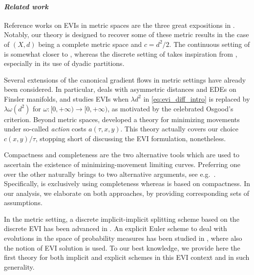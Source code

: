 \documentclass[reqno]{amsart}
\newcounter{results}[section]
\theoremstyle{plain}
\theoremstyle{remark}
\theoremstyle{plain}
\numberwithin{equation}{section}
\theoremstyle{remark}
\begin{document}
\medskip

\paragraph{\em\bfseries Related work}  Reference works on EVIs in metric spaces are the  three great expositions  in   \cite{ags08,Ambrosio2012userguide,MuratoriSavare}.  Notably, our theory is designed to recover some of these metric results in the case of $(X,d)$ being  a complete metric space and $c={d^2}/{2}$.  The  continuous setting of   is somewhat   closer to \cite[Section 3]{MuratoriSavare},  whereas the  discrete setting of   takes  inspiration from \cite[Section 3.2.4]{Ambrosio2012userguide},  especially in its use of dyadic partitions.  

Several extensions of the canonical gradient flows in metric settings have  already   been considered.  In particular, \cite{Ohta2023}  deals with  asymmetric distances and EDEs on Finsler manifolds,  and  \cite{Craig2017}  studies  EVIs when $\lambda d^2$ in \eqref{eq:evi_diff_intro} is  replaced by $\lambda \omega(d^2)$  for  $\omega:[0,+\infty)\to [0,+\infty)$,  as  motivated by  the celebrated  Osgood's criterion. Beyond  metric spaces,  \cite{Rossi2024} developed a theory for minimizing movements  under so-called  {\it action} costs $a(\tau,x,y)$.  This theory actually covers our choice ${c(x,y)}/{\tau}$, stopping short of discussing the EVI formulation, nonetheless.  

Compactness and completeness are  the two alternative tools which are used to ascertain the existence of minimizing-movement limiting curves. Preferring one over the other naturally brings to two alternative arguments, see e.g.~\cite{rankin2024jkoschemesgeneraltransport}.  Specifically, \cite{MuratoriSavare}  is exclusively using  completeness  whereas \cite{Ohta2023} is based  on compactness.  In our analysis, we elaborate on both approaches, by  providing corresponding sets  
of assumptions.   

In  the metric setting, a  discrete implicit-implicit splitting scheme based on the discrete EVI  has been advanced in \cite[Eq.~(1.1)]{Clement2011}.   An explicit Euler scheme to deal with evolutions in the space of probability measures has been studied in \cite{CavagnariSavareSodini22}, where also the notion of EVI solution is used. 
To our best knowledge,  we provide here the first theory for both implicit and explicit schemes in this EVI context  and in such generality. 
\end{document}
